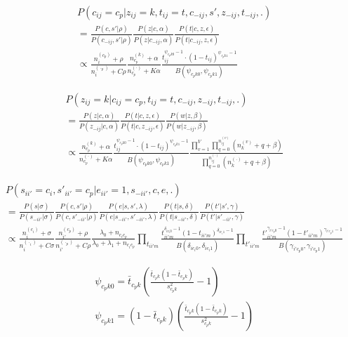 \documentclass{article}
\begin{document}
\begin{align*}
	&P(c_{ij}=c_p|z_{ij}=k, t_{ij}=t, c_{-ij}, s', z_{-ij}, t_{-ij},.)\\
	&=\frac{P(c,s'|\rho)}{P(c_{-ij},s'|\rho)}
	\frac{P(z|c,\alpha)}{P(z|c_{-ij},\alpha)}
	\frac{P(t|c,z,\epsilon)}{P(t|c_{-ij},z,\epsilon)}\\
	&\propto \frac{n_i^{(c_p)}+\rho}{n_i^{(\cdot_p)}+C\rho}
	\frac{n_{c_p}^{(k)}+\alpha}{n_{c_p}^{(\cdot)}+K\alpha}
	\frac{t_{ij}^{\psi_{c_pk0}-1}\cdot (1-t_{ij})^{\psi_{c_pk1}-1}}{B(\psi_{c_pk0}, \psi_{c_pk1})}
\end{align*}



\begin{align*}
	&P(z_{ij}=k|c_{ij}=c_p, t_{ij}=t, c_{-ij}, z_{-ij}, t_{-ij},.)\\
	&=\frac{P(z|c,\alpha)}{P(z_{-ij}|c,\alpha)}
	\frac{P(t|c,z,\epsilon)}{P(t|c,z_{-ij},\epsilon)}
	\frac{P(w|z,\beta)}{P(w|z_{-ij},\beta)}\\
	&\propto \frac{n_{c_p}^{(k)}+\alpha}{n_{c_p}^{(\cdot)}+K\alpha}
	\frac{t_{ij}^{\psi_{c_pk0}-1}\cdot (1-t_{ij})^{\psi_{c_pk1}-1}}{B(\psi_{c_pk0}, \psi_{c_pk1})}
	\frac{\prod_{v=1}^{V}{\prod_{q=0}^{n_{ij}^{(v)}}{(n_k^{(v)}+q+\beta)}}}{\prod_{q=0}^{n_{ij}^{(\cdot)}}{(n_k^{(\cdot)}+q+\beta)}}
\end{align*}



\begin{align*}
	&P(s_{ii'}=c_i, s'_{ii'}=c_p|e_{ii'}=1,s_{-ii'},c,e,.)\\
	&=\frac{P(s|\sigma)}{P(s_{-ii'}|\sigma)}
	\frac{P(c,s'|\rho)}{P(c,s'_{-ii'}|\rho)}
	\frac{P(e|s,s',\lambda)}{P(e|s_{-ii'},s'_{-ii'},\lambda)}
	\frac{P(t|s,\delta)}{P(t|s_{-ii'},\delta)}
	\frac{P(t'|s',\gamma)}{P(t'|s'_{-ii'},\gamma)}\\
	&\propto \frac{n_i^{(c_i)}+\sigma}{n_i^{(\cdot_i)}+C\sigma}
	\frac{n_{i'}^{(c_p)}+\rho}{n_{i'}^{(\cdot_p)}+C\rho}
	\frac{\lambda_0+n_{c_ic_p}}{\lambda_0+\lambda_1+n_{c_ic_p}}
	\prod_{t_{ii'm}}{\frac{t_{ii'm}^{\delta_{ic_i0}-1}(1-t_{ii'm})^{\delta_{ic_i1}-1}}{B(\delta_{ic_i0},\delta_{ic_i1})}}
	\prod_{{t'}_{ii'm}}{\frac{{t'}_{ii'm}^{\gamma_{i'c_p0}-1}(1-{t'}_{ii'm})^{\gamma_{i'c_p1}-1}}{B(\gamma_{i'c_p0},\gamma_{i'c_p1})}}
\end{align*}

\begin{align*}
	&\psi_{c_pk0}=\bar{t}_{c_pk}(\frac{\bar{t}_{c_pk}(1-\bar{t}_{c_pk})}{s_{c_pk}^2}-1)\\
	&\psi_{c_pk1}=(1-\bar{t}_{c_pk})(\frac{\bar{t}_{c_pk}(1-\bar{t}_{c_pk})}{s_{c_pk}^2}-1)
\end{align*}
\end{document}
